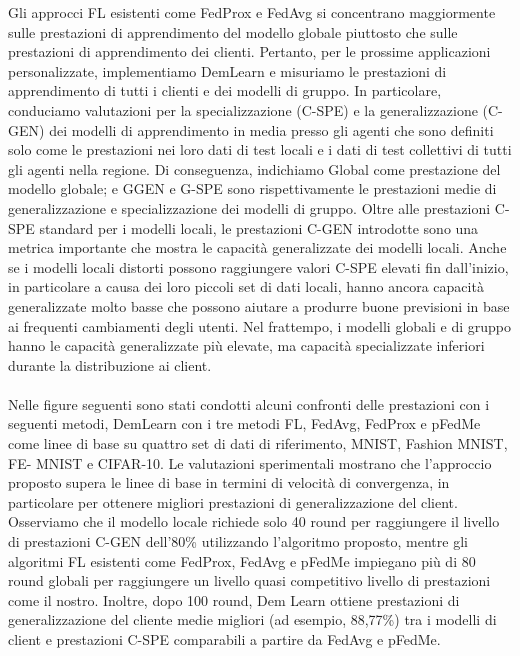 Gli approcci FL esistenti come FedProx e FedAvg si concentrano maggiormente sulle prestazioni di apprendimento del modello globale piuttosto che sulle prestazioni di apprendimento dei clienti. Pertanto, per le prossime applicazioni personalizzate, implementiamo DemLearn e misuriamo le prestazioni di apprendimento di tutti i clienti e dei modelli di gruppo. In particolare, conduciamo valutazioni per la specializzazione (C-SPE) e la generalizzazione (C-GEN) dei modelli di apprendimento in media presso gli agenti che sono definiti solo come le prestazioni nei loro dati di test locali e i dati di test collettivi di tutti gli agenti nella regione. Di conseguenza, indichiamo Global come prestazione del modello globale; e GGEN e G-SPE sono rispettivamente le prestazioni medie di generalizzazione e specializzazione dei modelli di gruppo. Oltre alle prestazioni C-SPE standard per i modelli locali, le prestazioni C-GEN introdotte sono una metrica importante che mostra le capacità generalizzate dei modelli locali. Anche se i modelli locali distorti possono raggiungere valori C-SPE elevati fin dall'inizio, in particolare a causa dei loro piccoli set di dati locali, hanno ancora capacità generalizzate molto basse che possono aiutare a produrre buone previsioni in base ai frequenti cambiamenti degli utenti. Nel frattempo, i modelli globali e di gruppo hanno le capacità generalizzate più elevate, ma capacità specializzate inferiori durante la distribuzione ai client.\\\\
Nelle figure seguenti sono stati condotti alcuni confronti delle prestazioni con i seguenti metodi, DemLearn con i tre metodi FL, FedAvg, FedProx e pFedMe come linee di base su quattro set di dati di riferimento, MNIST, Fashion MNIST, FE- MNIST e CIFAR-10. Le valutazioni sperimentali mostrano che l'approccio proposto supera le linee di base in termini di velocità di convergenza, in particolare per ottenere migliori prestazioni di generalizzazione del client. Osserviamo che il modello locale richiede solo 40 round per raggiungere il livello di prestazioni C-GEN dell'80\% utilizzando l'algoritmo proposto, mentre gli algoritmi FL esistenti come FedProx, FedAvg e pFedMe impiegano più di 80 round globali per raggiungere un livello quasi competitivo livello di prestazioni come il nostro. Inoltre, dopo 100 round, Dem Learn ottiene prestazioni di generalizzazione del cliente medie migliori (ad esempio, 88,77\%) tra i modelli di client e prestazioni C-SPE  comparabili a partire da FedAvg e pFedMe.\\
